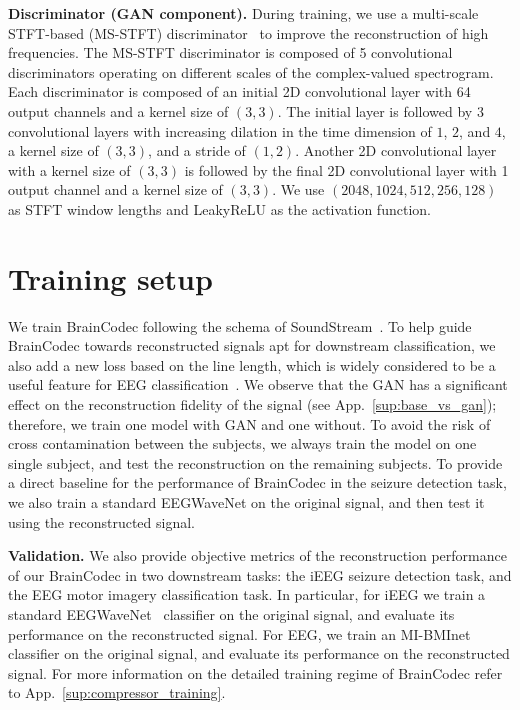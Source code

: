 \documentclass{article} %
\begin{document}
\textbf{Discriminator (GAN component).} During training, we use a multi-scale STFT-based (MS-STFT) discriminator~\citep{Defossez2023} to improve the reconstruction of high frequencies. The MS-STFT discriminator is composed of 5 convolutional discriminators operating on different scales of the complex-valued spectrogram. Each discriminator is composed of an initial 2D convolutional layer with 64 output channels and a kernel size of $(3, 3)$. The initial layer is followed by $3$ convolutional layers with increasing dilation in the time dimension of $1$, $2$, and $4$, a kernel size of $(3, 3)$, and a stride of $(1, 2)$. Another 2D convolutional layer with a kernel size of $(3, 3)$ is followed by the final 2D convolutional layer with 1 output channel and a kernel size of $(3, 3)$. We use $(2048, 1024, 512, 256, 128)$ as STFT window lengths and LeakyReLU as the activation function. 























\section{Training setup}\label{sec:training}

We train BrainCodec following the schema of SoundStream~\citep{Zeghidour2022}. To help guide BrainCodec towards reconstructed signals apt for downstream classification, we also add a new loss based on the line length, which is widely considered to be a useful feature for EEG classification~\citep{Schindler2001, Guo2010, Burrello2021}. We observe that the GAN has a significant effect on the reconstruction fidelity of the signal (see App.~\ref{sup:base_vs_gan}); therefore, we train one model with GAN and one without. To avoid the risk of cross contamination between the subjects, we always train the model on one single subject, and test the reconstruction on the remaining subjects.
To provide a direct baseline for the performance of BrainCodec in the seizure detection task, we also train a standard EEGWaveNet on the original signal, and then test it using the reconstructed signal.

\textbf{Validation.} We also provide objective metrics of the reconstruction performance of our BrainCodec in two downstream tasks: the iEEG seizure detection task, and the EEG motor imagery classification task. In particular, for iEEG we train a standard EEGWaveNet~\citep{Thuwajit2022} classifier on the original signal, and evaluate its performance on the reconstructed signal. For EEG, we train an MI-BMInet~\citep{Wang2024} classifier on the original signal, and evaluate its performance on the reconstructed signal. For more information on the detailed training regime of BrainCodec refer to App.~\ref{sup:compressor_training}. 
\end{document}
